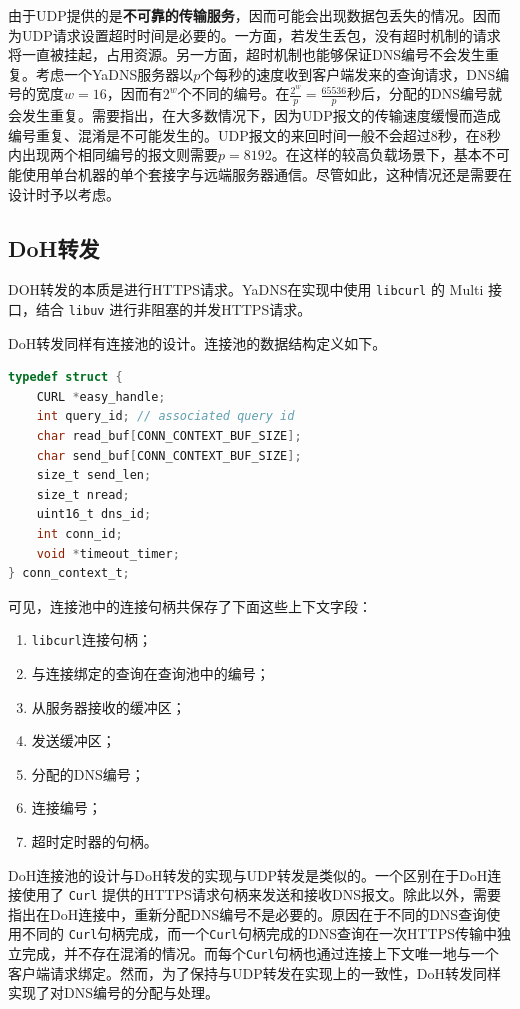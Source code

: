由于UDP提供的是\textbf{不可靠的传输服务}，因而可能会出现数据包丢失的情况。因而为UDP请求设置超时时间是必要的。一方面，若发生丢包，没有超时机制的请求将一直被挂起，占用资源。另一方面，超时机制也能够保证DNS编号不会发生重复。考虑一个YaDNS服务器以$p$个每秒的速度收到客户端发来的查询请求，DNS编号的宽度$w=16$，因而有$2^w$个不同的编号。在$\frac {2^w} p = \frac {65536} p$秒后，分配的DNS编号就会发生重复。需要指出，在大多数情况下，因为UDP报文的传输速度缓慢而造成编号重复、混淆是不可能发生的。UDP报文的来回时间一般不会超过$8$秒，在$8$秒内出现两个相同编号的报文则需要$p = 8192$。在这样的较高负载场景下，基本不可能使用单台机器的单个套接字与远端服务器通信。尽管如此，这种情况还是需要在设计时予以考虑。

\subsection{DoH转发}

DOH转发的本质是进行HTTPS请求。YaDNS在实现中使用 \lstinline{libcurl} 的 Multi 接口，结合 \lstinline{libuv} 进行非阻塞的并发HTTPS请求。

DoH转发同样有连接池的设计。连接池的数据结构定义如下。

\begin{lstlisting}[language=C]
typedef struct {
    CURL *easy_handle;
    int query_id; // associated query id
    char read_buf[CONN_CONTEXT_BUF_SIZE];
    char send_buf[CONN_CONTEXT_BUF_SIZE];
    size_t send_len;
    size_t nread;
    uint16_t dns_id;
    int conn_id;
    void *timeout_timer;
} conn_context_t;
\end{lstlisting}

可见，连接池中的连接句柄共保存了下面这些上下文字段：
\begin{enumerate}
  \item \lstinline{libcurl}连接句柄；
  \item 与连接绑定的查询在查询池中的编号；
  \item 从服务器接收的缓冲区；
  \item 发送缓冲区；
  \item 分配的DNS编号；
  \item 连接编号；
  \item 超时定时器的句柄。
\end{enumerate}

DoH连接池的设计与DoH转发的实现与UDP转发是类似的。一个区别在于DoH连接使用了 \lstinline{Curl} 提供的HTTPS请求句柄来发送和接收DNS报文。除此以外，需要指出在DoH连接中，重新分配DNS编号不是必要的。原因在于不同的DNS查询使用不同的 \lstinline{Curl}句柄完成，而一个\lstinline{Curl}句柄完成的DNS查询在一次HTTPS传输中独立完成，并不存在混淆的情况。而每个\lstinline{Curl}句柄也通过连接上下文唯一地与一个客户端请求绑定。然而，为了保持与UDP转发在实现上的一致性，DoH转发同样实现了对DNS编号的分配与处理。

